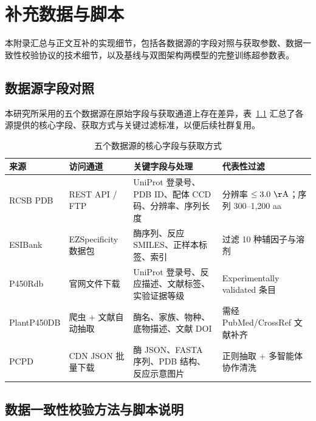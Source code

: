 
\chapter{补充数据与脚本}
\label{app:supplementary}

本附录汇总与正文互补的实现细节，包括各数据源的字段对照与获取参数、数据一致性校验协议的技术细节，以及基线与双图架构两模型的完整训练超参数表。

\section{数据源字段对照}
\label{app:data-sources}

本研究所采用的五个数据源在原始字段与获取通道上存在差异，表~\ref{tab:app-sources} 汇总了各源提供的核心字段、获取方式与关键过滤标准，以便后续社群复用。

\begin{table}[htbp]
  \centering
  \caption{五个数据源的核心字段与获取方式}
  \label{tab:app-sources}
  \begin{tabular}{llp{}l}
    \toprule
    来源 & 访问通道 & 关键字段与处理 & 代表性过滤 \\
    \midrule
    RCSB PDB & REST API / FTP      & UniProt 登录号、PDB ID、配体 CCD 码、分辨率、序列长度                               & 分辨率 $\leq 3.0~\mathrm{\AA}$；序列 300--1{,}200 aa \\
    ESIBank  & EZSpecificity 数据包 & 酶序列、反应 SMILES、正样本标签、索引                                              & 过滤 10 种辅因子与溶剂 \\
    P450Rdb  & 官网文件下载         & UniProt 登录号、反应描述、文献标签、实验证据等级                                     & Experimentally validated 条目 \\
    PlantP450DB & 爬虫 + 文献自动抽取 & 酶名、家族、物种、底物描述、文献 DOI                                                 & 需经 PubMed/CrossRef 文献补齐 \\
    PCPD     & CDN JSON 批量下载    & 酶 JSON、FASTA 序列、PDB 结构、反应示意图片                                          & 正则抽取 + 多智能体协作清洗 \\
    \bottomrule
  \end{tabular}
\end{table}

\section{数据一致性校验方法与脚本说明}
\label{app:qc-protocol}

